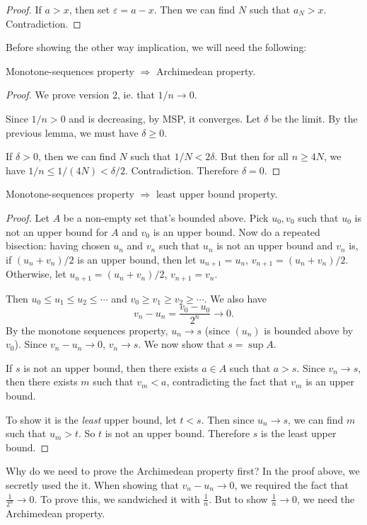 \documentclass[a4paper]{article}
\begin{document}
\begin{proof}
  If $a > x$, then set $\varepsilon = a - x$. Then we can find $N$ such that $a_N > x$. Contradiction.
\end{proof}

Before showing the other way implication, we will need the following:
\begin{lemma}
  Monotone-sequences property $\Rightarrow$ Archimedean property.
\end{lemma}

\begin{proof}
  We prove version 2, ie. that $1/n \to 0$.

  Since $1/n > 0$ and is decreasing, by MSP, it converges. Let $\delta$ be the limit. By the previous lemma, we must have $\delta \geq 0$.

  If $\delta > 0$, then we can find $N$ such that $1/N < 2\delta$. But then for all $n \geq 4N$, we have $1/n \leq 1/(4N) < \delta/2$. Contradiction. Therefore $\delta = 0$.
\end{proof}

\begin{lemma}
  Monotone-sequences property $\Rightarrow$ least upper bound property.
\end{lemma}

\begin{proof}
  Let $A$ be a non-empty set that's bounded above. Pick $u_0, v_0$ such that $u_0$ is not an upper bound for $A$ and $v_0$ is an upper bound. Now do a repeated bisection: having chosen $u_n$ and $v_n$ such that $u_n$ is not an upper bound and $v_n$ is, if $(u_n + v_n)/2$ is an upper bound, then let $u_{n + 1} = u_n$, $v_{n + 1} = (u_n + v_n)/2$. Otherwise, let $u_{n + 1} = (u_n + v_n)/2$, $v_{n + 1} = v_n$.

  Then $u_0 \leq u_1 \leq u_2 \leq \cdots$ and $v_0\geq v_1 \geq v_2 \geq \cdots$. We also have
  \[
    v_n - u_n = \frac{v_0 - u_0}{2^n} \to 0.
  \]
  By the monotone sequences property, $u_n\to s$ (since $(u_n)$ is bounded above by $v_0$). Since $v_n - u_n \to 0$, $v_n \to s$. We now show that $s = \sup A$.

  If $s$ is not an upper bound, then there exists $a\in A$ such that $a > s$. Since $v_n \to s$, then there exists $m$ such that $v_m < a$, contradicting the fact that $v_m$ is an upper bound.

  To show it is the \emph{least} upper bound, let $t < s$. Then since $u_n \to s$, we can find $m$ such that $u_m > t$. So $t$ is not an upper bound. Therefore $s$ is the least upper bound.
\end{proof}
Why do we need to prove the Archimedean property first? In the proof above, we secretly used the it. When showing that $v_n - u_n \to 0$, we required the fact that $\frac{1}{2^n} \to 0$. To prove this, we sandwiched it with $\frac{1}{n}$. But to show $\frac{1}{n}\to 0$, we need the Archimedean property.
\end{document}
